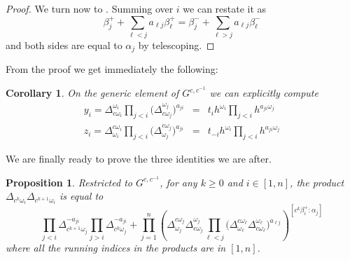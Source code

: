 \documentclass[12pt]{amsart}
\newcommand{\saySS}[1]{\say[SS]{\color{blue}{\bf SS:}\;#1}}
\newtheorem{corollary}[theorem]{Corollary}
\newtheorem{proposition}[theorem]{Proposition}
\numberwithin{equation}{section}
\begin{document}
\begin{proof}
  We turn now to .
  Summing over $i$ we can restate it as
  \begin{equation}
    \beta_j^++\sum_{\ell<j}a_{\ell j}\beta_\ell^+
    =
    \beta_j^-+\sum_{\ell>j}a_{\ell j}\beta_\ell^-
  \end{equation}
  and both sides are equal to $\alpha_j$ by telescoping.
\end{proof}

From the proof  we get immediately the following:
\begin{corollary}
  \label{corollary:coefficients_values}
  \saySS{Scholium?}
  On the generic element  of $G^{c,c^{-1}}$ we can explicitly compute
  \begin{eqnarray}
    y_i=
    \Delta_{c\omega_i}^{\omega_i}
    \prod_{ j <i}\big(\Delta_{c\omega_ j }^{\omega_ j }\big)^{a_{ j  i}}
    &=&
    t_i
    h^{\omega_i}\prod_{ j <i}h^{a_{ j  i}\omega_ j }\\
    z_i=
    \Delta_{\omega_i}^{c\omega_i}
    \prod_{ j <i}\big(\Delta_{\omega_ j }^{c\omega_ j }\big)^{a_{ j  i}}
    &=&
    t_{-i}
    h^{\omega_i}\prod_{ j <i}h^{a_{ j  i}\omega_ j }
  \end{eqnarray}
\end{corollary}

We are finally ready to prove the three identities we are after.

\begin{proposition}
  \label{prop:projective_minors_identity}
  Restricted to $G^{c,c^{-1}}$, for any $k\geq 0$ and $i\in[1,n]$, the product $\Delta_{c^k\omega_i}\Delta_{c^{k+1}\omega_i}$ is equal to
  \begin{equation} 
    \prod_{j<i}\Delta_{c^{k+1}\omega_j}^{-a_{ji}}
    \prod_{j>i}\Delta_{c^k\omega_j}^{-a_{ji}}
    +
    \prod_{j=1}^n\left( 
      \Delta^{c \omega_j}_{\omega_j}
      \Delta^{\omega_j}_{ c\omega_j} 
      \prod_{\ell<j}\big(
        \Delta^{c \omega_\ell}_{\omega_\ell} 
        \Delta^{\omega_\ell}_{c \omega_\ell}
      \big)^{a_{\ell j}}
    \right)^{[c^k\beta_i^+:\alpha_j]}
  \end{equation}
  where all the running indices in the products are in $[1,n]$.
\end{proposition}
\end{document}
